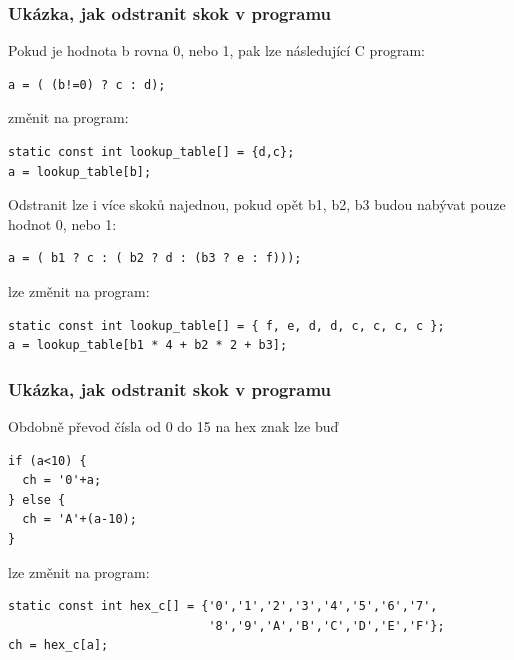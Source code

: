 \documentclass{beamer}
\begin{document}
\begin{frame}[fragile]
\frametitle{Ukázka, jak odstranit skok v programu}

Pokud je hodnota b rovna 0, nebo 1, pak lze následující C program:

\begin{verbatim}
a = ( (b!=0) ? c : d);
\end{verbatim}

změnit na program:

\begin{verbatim}
static const int lookup_table[] = {d,c};
a = lookup_table[b];
\end{verbatim}

\bigskip
Odstranit lze i více skoků najednou, pokud opět b1, b2, b3 budou nabývat pouze hodnot 0, nebo 1:

\begin{verbatim}
a = ( b1 ? c : ( b2 ? d : (b3 ? e : f)));
\end{verbatim}

lze změnit na program:

\begin{verbatim}
static const int lookup_table[] = { f, e, d, d, c, c, c, c };
a = lookup_table[b1 * 4 + b2 * 2 + b3];
\end{verbatim}
\end{frame}

\begin{frame}[fragile]
\frametitle{Ukázka, jak odstranit skok v programu}

Obdobně převod čísla od 0 do 15 na hex znak lze buď
\begin{verbatim}
if (a<10) {
  ch = '0'+a;
} else {
  ch = 'A'+(a-10);
}
\end{verbatim}

lze změnit na program:

\begin{verbatim}
static const int hex_c[] = {'0','1','2','3','4','5','6','7',
                            '8','9','A','B','C','D','E','F'};
ch = hex_c[a];
\end{verbatim}
\end{frame}
\end{document}

